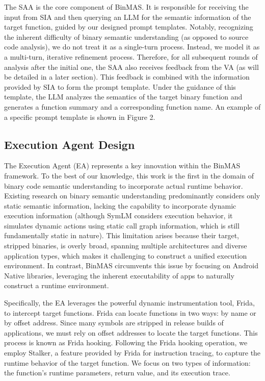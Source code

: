 \documentclass[acmsmall,screen,review,anonymous]{acmart} %
\begin{document}
The SAA is the core component of BinMAS. It is responsible for receiving the input from SIA and then querying an LLM for the semantic information of the target function, guided by our designed prompt templates. Notably, recognizing the inherent difficulty of binary semantic understanding (as opposed to source code analysis), we do not treat it as a single-turn process. Instead, we model it as a multi-turn, iterative refinement process. Therefore, for all subsequent rounds of analysis after the initial one, the SAA also receives feedback from the VA (as will be detailed in a later section). This feedback is combined with the information provided by SIA to form the prompt template. Under the guidance of this template, the LLM analyzes the semantics of the target binary function and generates a function summary and a corresponding function name. An example of a specific prompt template is shown in Figure 2.


\subsection{Execution Agent Design}

The Execution Agent (EA) represents a key innovation within the BinMAS framework. To the best of our knowledge, this work is the first in the domain of binary code semantic understanding to incorporate actual runtime behavior. Existing research on binary semantic understanding predominantly considers only static semantic information, lacking the capability to incorporate dynamic execution information (although SymLM considers execution behavior, it simulates dynamic actions using static call graph information, which is still fundamentally static in nature). This limitation arises because their target, stripped binaries, is overly broad, spanning multiple architectures and diverse application types, which makes it challenging to construct a unified execution environment. In contrast, BinMAS circumvents this issue by focusing on Android Native libraries, leveraging the inherent executability of apps to naturally construct a runtime environment.

Specifically, the EA leverages the powerful dynamic instrumentation tool, Frida, to intercept target functions. Frida can locate functions in two ways: by name or by offset address. Since many symbols are stripped in release builds of applications, we must rely on offset addresses to locate the target functions. This process is known as Frida hooking. Following the Frida hooking operation, we employ Stalker, a feature provided by Frida for instruction tracing, to capture the runtime behavior of the target function. We focus on two types of information: the function's runtime parameters, return value, and its execution trace.
\end{document}
